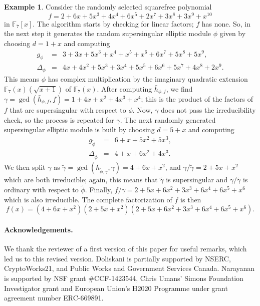\documentclass[11pt]{article}
\theoremstyle{definition}
\newtheorem*{example*}{Example}
\def\F{\ensuremath{\mathbb{F}}}
\begin{document}
\begin{example*}
Consider the randomly selected squarefree polynomial 
\[ f = 2 + 6x + 5x^3 + 4x^4 + 6x^5 + 2x^7 + 3x^8 + 3x^9 + x^{10} \]
in $\F_7[x]$. The algorithm starts by checking for linear factors; $f$ has none. So, in the 
next step it generates the random supersingular elliptic module $\phi$ given by
choosing $d=1+x$ and computing
\[
\begin{array}{rll}
	g_\phi & = & 3 + 3x + 5x^3 + x^4 + x^5 + x^6 + 6x^7 + 5x^8 + 5x^9,\\
        \Delta_\phi&=&4x+4x^2+5x^3+3x^4+5x^5+6x^6+5x^7+4x^8+2x^9.
\end{array}
\]
This means $\phi$ has complex multiplication by the imaginary
quadratic extension $\F_7(x)(\sqrt{x + 1})$ of $\F_7(x)$. After
computing $\bar h_{\phi, f}$, we
find $\gamma = \gcd(\bar h_{\phi, f}, f) = 1 + 4x + x^2 + 4x^3 + x^4$; this is
the product of the factors of $f$ that are supersingular with respect
to $\phi$. Now, $\gamma$ does not pass the irreducibility check, so the
process is repeated for $\gamma$. The next randomly generated supersingular
elliptic module is built by choosing $d=5+x$ and computing
\[
\begin{array}{rll}
	g_{\tilde\phi} & = & 6 + x + 5x^2 + 5x^3,\\
	\Delta_{\tilde \phi} & = & 4+x + 6x^2 + 4x^3.
\end{array}
\]
We then split $\gamma$ as $ \tilde \gamma = \gcd(\bar h_{\tilde \phi,
  \gamma}, \gamma) = 4 + 6x + x^2$, and $\gamma/\tilde \gamma = 2 + 5x
+ x^2$ which are both irreducible; again, this means that $\tilde \gamma$
is supersingular and $\gamma/\tilde \gamma$ is ordinary with respect to $\tilde
\phi$. Finally, $f / \gamma = 2 + 5x + 6x^2 + 3x^3 + 6x^4 + 6x^5 + x^6$
which is also irreducible. The complete factorization of $f$ is
then \[ f(x) = (4 + 6x + x^2)(2 + 5x + x^2)(2 + 5x + 6x^2 + 3x^3 +
6x^4 + 6x^5 + x^6).\]
\end{example*}

\paragraph*{Acknowledgements.} We thank the reviewer of a first version
of this paper for useful remarks, which led us to this revised version. Doliskani is partially 
supported by NSERC, CryptoWorks21, and Public Works and Government Services Canada. Narayanan is 
supported by NSF grant \#CCF-1423544, Chris Umans' Simons Foundation Investigator grant and 
European Union's H2020 Programme under grant agreement number ERC-669891.




\end{document}
